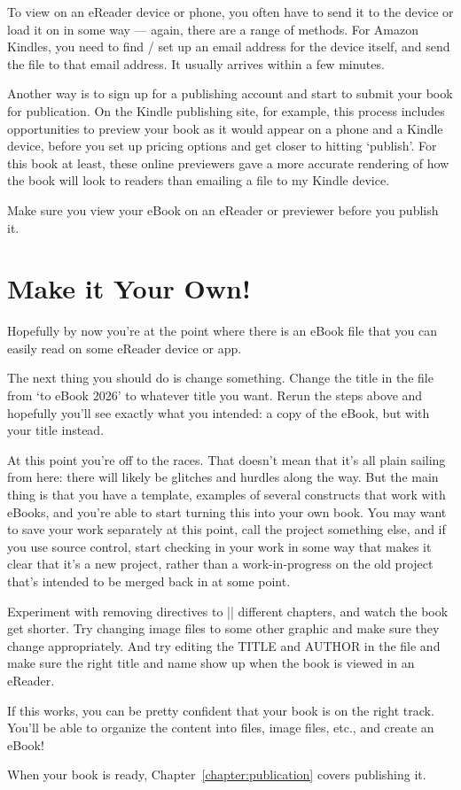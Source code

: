 To view on an eReader device or phone, you often have to send it to
the device or load it on in some way --- again, there are a range of
methods. For Amazon Kindles, you need to find / set up an email address for the
device itself, and send the  file to that email address.
It usually arrives within a few minutes.

Another way is to sign up for a publishing account and start to submit your book for
publication. On the Kindle publishing site, for example, this process includes opportunities
to preview your book as it would appear on a phone and a Kindle device, before you set up
pricing options and get closer to hitting `publish'. For this book at least, these online previewers
gave a more accurate rendering of how the book will look to readers than emailing a file to my
Kindle device.

Make sure you view your eBook on an eReader or previewer before you publish it.

\section{Make it Your Own!}

Hopefully by now you're at the point where there is an eBook file that you can easily read on some eReader device or app. 

The next thing you should do is change something. Change the title in the  file from `\latex to eBook 2026'
to whatever title you want. Rerun the steps above and hopefully you'll see exactly what you intended: a copy of the eBook, but with
your title instead.

At this point you're off to the races. That doesn't mean that it's all plain sailing from here: there will likely be glitches and hurdles along the way.
But the main thing is that you have a template, examples of several \latex constructs that work with eBooks, and you're able to start turning this
into your own book. You may want to save your work separately at this point, call the project something else, and if you use source control,
start checking in your work in some way that makes it clear that it's a new project, rather than a work-in-progress on the old project that's intended to be
merged back in at some point.

Experiment with removing directives to \sverb|| different chapters, and watch the book get shorter. Try changing image files to some other graphic
and make sure they change appropriately. And try editing the TITLE and AUTHOR in the  file and make sure the right title and name show up when the book is viewed in an eReader.

If this works, you can be pretty confident that your book is on the right track. You'll be able to organize the content into \tex files, image files, etc., and create an eBook!

When your book is ready, Chapter~\ref{chapter:publication} covers publishing it.
